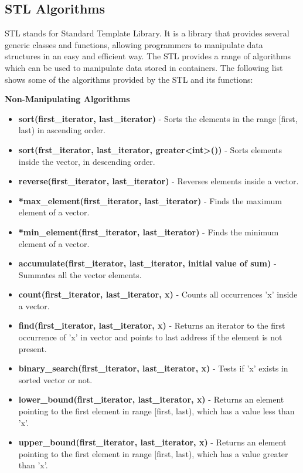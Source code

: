 \subsection{STL Algorithms}
\begin{justify}
STL stands for Standard Template Library. It is a library that provides several generic 
classes and functions, allowing programmers to manipulate data structures in an easy and efficient way.
The STL provides a range of algorithms which can be used to manipulate data stored in containers. The following 
list shows some of the algorithms provided by the STL and its functions:
\end{justify}
\textbf{Non-Manipulating Algorithms}
\begin{itemize}
\item \textbf{sort(first\_iterator, last\_iterator)} - Sorts the elements in the range [first, last) in ascending order.
\item \textbf{sort(frst\_iterator, last\_iterator, greater\textless int\textgreater())} - Sorts elements inside the vector, in descending order.
\item \textbf{reverse(first\_iterator, last\_iterator)} - Reverses elements inside a vector.
\item \textbf{*max\_element(first\_iterator, last\_iterator)} - Finds the maximum element of a vector.
\item \textbf{*min\_element(first\_iterator, last\_iterator)} - Finds the minimum element of a vector.
\item \textbf{accumulate(first\_iterator, last\_iterator, initial value of sum)} - Summates all the vector elements.
\item \textbf{count(first\_iterator, last\_iterator, x)} - Counts all occurrences 'x' inside a vector.
\item \textbf{find(first\_iterator, last\_iterator, x)} - Returns an iterator to the first occurrence of 'x' in vector and points to last address if the element is not present.
\item \textbf{binary\_search(first\_iterator, last\_iterator, x)} - Tests if 'x' exists in sorted vector or not.
\item \textbf{lower\_bound(first\_iterator, last\_iterator, x)} - Returns an element pointing to the first element in range [first, last), which has a value less than 'x'.
\item \textbf{upper\_bound(first\_iterator, last\_iterator, x)} - Returns an element pointing to the first element in range [first, last), which has a value greater than 'x'.
\end{itemize}
